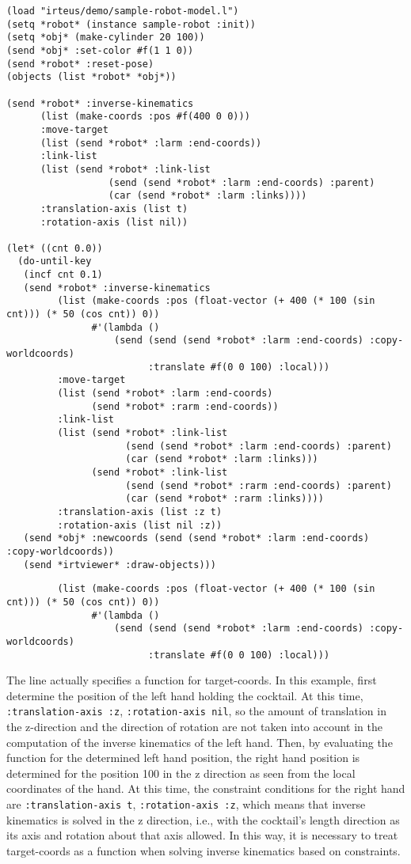 {\baselineskip=10pt
\begin{verbatim}
(load "irteus/demo/sample-robot-model.l")
(setq *robot* (instance sample-robot :init))
(setq *obj* (make-cylinder 20 100))
(send *obj* :set-color #f(1 1 0))
(send *robot* :reset-pose)
(objects (list *robot* *obj*))

(send *robot* :inverse-kinematics
      (list (make-coords :pos #f(400 0 0)))
      :move-target
      (list (send *robot* :larm :end-coords))
      :link-list
      (list (send *robot* :link-list
                  (send (send *robot* :larm :end-coords) :parent)
                  (car (send *robot* :larm :links))))
      :translation-axis (list t)
      :rotation-axis (list nil))

(let* ((cnt 0.0))
  (do-until-key
   (incf cnt 0.1)
   (send *robot* :inverse-kinematics
         (list (make-coords :pos (float-vector (+ 400 (* 100 (sin cnt))) (* 50 (cos cnt)) 0))
               #'(lambda ()
                   (send (send (send *robot* :larm :end-coords) :copy-worldcoords)
                         :translate #f(0 0 100) :local)))
         :move-target
         (list (send *robot* :larm :end-coords)
               (send *robot* :rarm :end-coords))
         :link-list
         (list (send *robot* :link-list
                     (send (send *robot* :larm :end-coords) :parent)
                     (car (send *robot* :larm :links)))
               (send *robot* :link-list
                     (send (send *robot* :rarm :end-coords) :parent)
                     (car (send *robot* :rarm :links))))
         :translation-axis (list :z t)
         :rotation-axis (list nil :z))
   (send *obj* :newcoords (send (send *robot* :larm :end-coords) :copy-worldcoords))
   (send *irtviewer* :draw-objects)))
\end{verbatim}
}

{\baselineskip=10pt
\begin{verbatim}
         (list (make-coords :pos (float-vector (+ 400 (* 100 (sin cnt))) (* 50 (cos cnt)) 0))
               #'(lambda ()
                   (send (send (send *robot* :larm :end-coords) :copy-worldcoords)
                         :translate #f(0 0 100) :local)))
\end{verbatim}
}

The line actually specifies a function for target-coords.
In this example, first determine the position of the left hand holding the cocktail. At this time, \verb|:translation-axis :z|, \verb|:rotation-axis nil|, so the amount of translation in the z-direction and the direction of rotation are not taken into account in the computation of the inverse kinematics of the left hand.
Then, by evaluating the function for the determined left hand position, the right hand position is determined for the position 100 in the z direction as seen from the local coordinates of the hand.
At this time, the constraint conditions for the right hand are \verb|:translation-axis t|, \verb|:rotation-axis :z|, which means that inverse kinematics is solved in the z direction, i.e., with the cocktail's length direction as its axis and rotation about that axis allowed.
In this way, it is necessary to treat target-coords as a function when solving inverse kinematics based on constraints.

